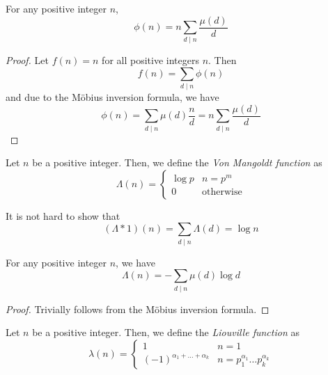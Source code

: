 \begin{theorem}
    For any positive integer $n$, 
    \begin{equation*}
        \phi(n) = n\sum_{d\mid n}\frac{\mu(d)}{d}
    \end{equation*}
\end{theorem}
\begin{proof}
    Let $f(n) = n$ for all positive integers $n$. Then
    \begin{equation*}
        f(n) = \sum_{d\mid n}\phi(n)
    \end{equation*}
    and due to the M\"obius inversion formula, we have 
    \begin{equation*}
        \phi(n) = \sum_{d\mid n}\mu(d)\frac{n}{d} = n\sum_{d\mid n}\frac{\mu(d)}{d}
    \end{equation*}
\end{proof}

\begin{definition}
    Let $n$ be a positive integer. Then, we define the \textit{Von Mangoldt function} as
    \begin{equation*}
        \Lambda(n) = 
        \begin{cases}
            \log p & n = p^m\\
            0 & \text{otherwise}
        \end{cases}
    \end{equation*}
\end{definition}

It is not hard to show that 
\begin{equation*}
    (\Lambda * 1)(n) = \sum_{d\mid n}\Lambda(d) = \log n
\end{equation*}

\begin{theorem}
    For any positive integer $n$, we have 
    \begin{equation*}
        \Lambda(n) = -\sum_{d\mid n}\mu(d)\log d
    \end{equation*}
\end{theorem}
\begin{proof}
    Trivially follows from the M\"obius inversion formula.
\end{proof}

\begin{definition}
    Let $n$ be a positive integer. Then, we define the \textit{Liouville function} as 
    \begin{equation*}
        \lambda(n) = 
        \begin{cases}
            1 & n = 1\\
            (-1)^{\alpha_1 + \ldots + \alpha_k} & n = p_1^{\alpha_1}\ldots p_k^{\alpha_k}
        \end{cases}
    \end{equation*}
\end{definition}


